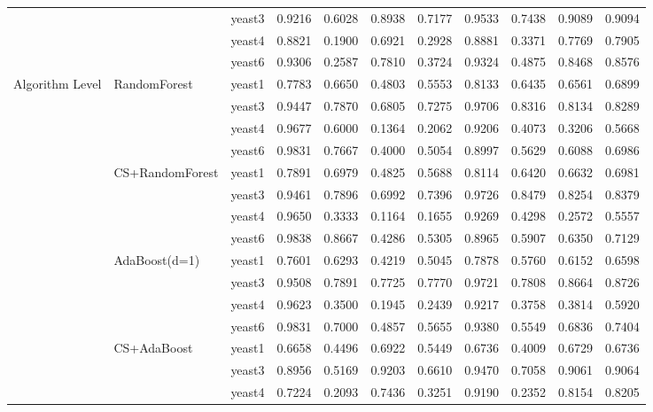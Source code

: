 \documentclass[sigconf]{acmart}
\begin{document}
\begin{table}[htbp]
\begin{tabular}{llccccccccc}
    & & yeast3 & 0.9216 & 0.6028 & 0.8938 & 0.7177 & 0.9533 & 0.7438 & 0.9089 & 0.9094 \\
    & & yeast4 & 0.8821 & 0.1900 & 0.6921 & 0.2928 & 0.8881 & 0.3371 & 0.7769 & 0.7905 \\
    & & yeast6 & 0.9306 & 0.2587 & 0.7810 & 0.3724 & 0.9324 & 0.4875 & 0.8468 & 0.8576 \\
    \midrule
    \multirow{20}{*}{Algorithm Level}
    & \multirow{4}{*}{RandomForest}
      & yeast1 & 0.7783 & 0.6650 & 0.4803 & 0.5553 & 0.8133 & 0.6435 & 0.6561 & 0.6899 \\
    & & yeast3 & 0.9447 & 0.7870 & 0.6805 & 0.7275 & 0.9706 & 0.8316 & 0.8134 & 0.8289 \\
    & & yeast4 & 0.9677 & 0.6000 & 0.1364 & 0.2062 & 0.9206 & 0.4073 & 0.3206 & 0.5668 \\
    & & yeast6 & 0.9831 & 0.7667 & 0.4000 & 0.5054 & 0.8997 & 0.5629 & 0.6088 & 0.6986 \\
    \cmidrule{2-11}
    & \multirow{4}{*}{CS+RandomForest}
      & yeast1 & 0.7891 & 0.6979 & 0.4825 & 0.5688 & 0.8114 & 0.6420 & 0.6632 & 0.6981 \\
    & & yeast3 & 0.9461 & 0.7896 & 0.6992 & 0.7396 & 0.9726 & 0.8479 & 0.8254 & 0.8379 \\
    & & yeast4 & 0.9650 & 0.3333 & 0.1164 & 0.1655 & 0.9269 & 0.4298 & 0.2572 & 0.5557 \\
    & & yeast6 & 0.9838 & 0.8667 & 0.4286 & 0.5305 & 0.8965 & 0.5907 & 0.6350 & 0.7129 \\
    \cmidrule{2-11}
    & \multirow{4}{*}{AdaBoost(d=1)}
      & yeast1 & 0.7601 & 0.6293 & 0.4219 & 0.5045 & 0.7878 & 0.5760 & 0.6152 & 0.6598 \\
    & & yeast3 & 0.9508 & 0.7891 & 0.7725 & 0.7770 & 0.9721 & 0.7808 & 0.8664 & 0.8726 \\
    & & yeast4 & 0.9623 & 0.3500 & 0.1945 & 0.2439 & 0.9217 & 0.3758 & 0.3814 & 0.5920 \\
    & & yeast6 & 0.9831 & 0.7000 & 0.4857 & 0.5655 & 0.9380 & 0.5549 & 0.6836 & 0.7404 \\
    \cmidrule{2-11}
    & \multirow{4}{*}{CS+AdaBoost}
      & yeast1 & 0.6658 & 0.4496 & 0.6922 & 0.5449 & 0.6736 & 0.4009 & 0.6729 & 0.6736 \\
    & & yeast3 & 0.8956 & 0.5169 & 0.9203 & 0.6610 & 0.9470 & 0.7058 & 0.9061 & 0.9064 \\
    & & yeast4 & 0.7224 & 0.2093 & 0.7436 & 0.3251 & 0.9190 & 0.2352 & 0.8154 & 0.8205 \\

\end{tabular}
\end{table}
\end{document}
